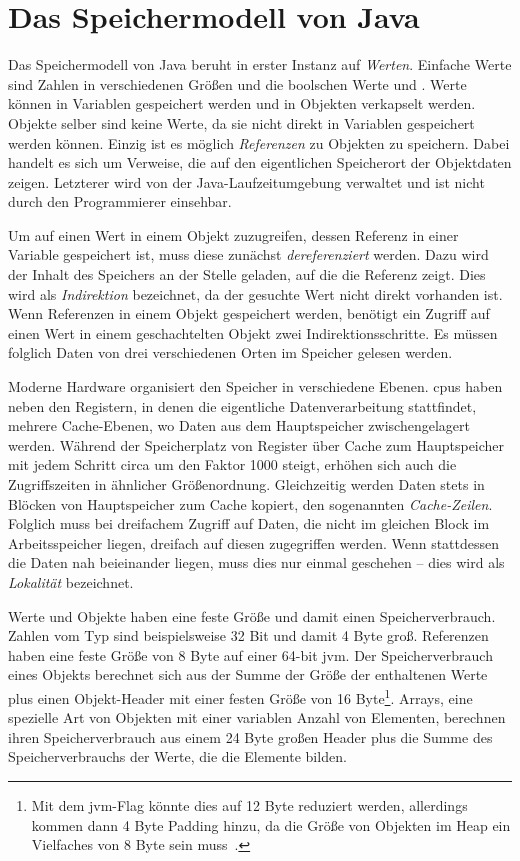 \section{Das Speichermodell von Java}\label{sec:memory-model}

Das Speichermodell von Java beruht in erster Instanz auf \emph{Werten}.
Einfache Werte sind Zahlen in verschiedenen Größen und die boolschen Werte  und .
Werte können in Variablen gespeichert werden und in Objekten verkapselt werden.
Objekte selber sind keine Werte, da sie nicht direkt in Variablen gespeichert werden können.
Einzig ist es möglich \emph{Referenzen} zu Objekten zu speichern.
Dabei handelt es sich um Verweise, die auf den eigentlichen Speicherort der Objektdaten zeigen.
Letzterer wird von der Java-Laufzeitumgebung verwaltet und ist nicht durch den Programmierer einsehbar.

Um auf einen Wert in einem Objekt zuzugreifen, dessen Referenz in einer Variable gespeichert ist, muss diese zunächst \emph{dereferenziert} werden.
Dazu wird der Inhalt des Speichers an der Stelle geladen, auf die die Referenz zeigt.
Dies wird als \emph{Indirektion} bezeichnet, da der gesuchte Wert nicht direkt vorhanden ist.
Wenn Referenzen in einem Objekt gespeichert werden, benötigt ein Zugriff auf einen Wert in einem geschachtelten Objekt zwei Indirektionsschritte.
Es müssen folglich Daten von drei verschiedenen Orten im Speicher gelesen werden.

Moderne Hardware organisiert den Speicher in verschiedene Ebenen.
\acp{cpu} haben neben den Registern, in denen die eigentliche Datenverarbeitung stattfindet, mehrere Cache-Ebenen, wo Daten aus dem Hauptspeicher zwischengelagert werden.
Während der Speicherplatz von Register über Cache zum Hauptspeicher mit jedem Schritt circa um den Faktor 1000 steigt, erhöhen sich auch die Zugriffszeiten in ähnlicher Größenordnung.
Gleichzeitig werden Daten stets in Blöcken von Hauptspeicher zum Cache kopiert, den sogenannten \emph{Cache-Zeilen}.
Folglich muss bei dreifachem Zugriff auf Daten, die nicht im gleichen Block im Arbeitsspeicher liegen, dreifach auf diesen zugegriffen werden.
Wenn stattdessen die Daten nah beieinander liegen, muss dies nur einmal geschehen -- dies wird als \emph{Lokalität} bezeichnet.

Werte und Objekte haben eine feste Größe und damit einen Speicherverbrauch.
Zahlen vom Typ  sind beispielsweise 32 Bit und damit 4 Byte groß.
Referenzen haben eine feste Größe von 8 Byte auf einer 64-bit \ac{jvm}.
Der Speicherverbrauch eines Objekts berechnet sich aus der Summe der Größe der enthaltenen Werte plus einen Objekt-Header mit einer festen Größe von 16 Byte\footnote{Mit dem \ac{jvm}-Flag  könnte dies auf 12 Byte reduziert werden, allerdings kommen dann 4 Byte Padding hinzu, da die Größe von Objekten im Heap ein Vielfaches von 8 Byte sein muss~\cite{compressed-oops}.}.
Arrays, eine spezielle Art von Objekten mit einer variablen Anzahl von Elementen, berechnen ihren Speicherverbrauch aus einem 24 Byte großen Header plus die Summe des Speicherverbrauchs der Werte, die die Elemente bilden.
~\cite{compressed-oops}

